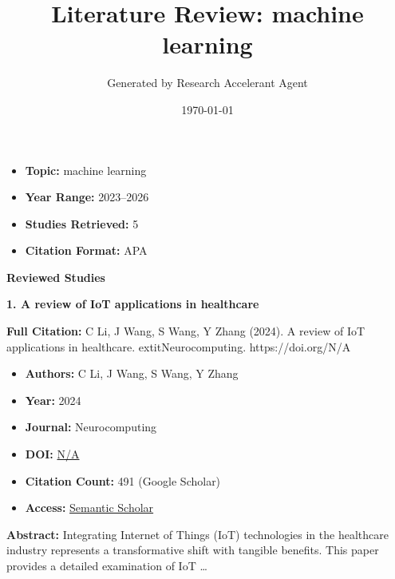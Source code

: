 \documentclass[11pt,a4paper]{article}
\title{\textbf{Literature Review: machine learning }}
\author{Generated by Research Accelerant Agent}
\date{\today}
\begin{document}
\maketitle



\begin{resultbox}
\begin{itemize}[leftmargin=*]
    \item \textbf{Topic:} machine learning 
    \item \textbf{Year Range:} 2023--2026
    \item \textbf{Studies Retrieved:} 5
    \item \textbf{Citation Format:} APA
\end{itemize}
\end{resultbox}

\vspace{1em}

\textbf{\large Reviewed Studies}\par\vspace{0.5em}


\textbf{1. A review of IoT applications in healthcare}

\textbf{Full Citation:} C Li, J Wang, S Wang, Y Zhang (2024). A review of IoT applications in healthcare. 	extit{Neurocomputing}. https://doi.org/N/A

\begin{resultbox}
\begin{itemize}[leftmargin=*]
    \item \textbf{Authors:} C Li, J Wang, S Wang, Y Zhang
    \item \textbf{Year:} 2024
    \item \textbf{Journal:} Neurocomputing
    
    
    
    \item \textbf{DOI:} \href{https://doi.org/}{N/A}
    \item \textbf{Citation Count:} 491 (Google Scholar)
    \item \textbf{Access:} \href{https://www.sciencedirect.com/science/article/pii/S0925231223011402}{Semantic Scholar}
\end{itemize}
\end{resultbox}

\textbf{Abstract:} Integrating Internet of Things (IoT) technologies in the healthcare industry represents a transformative shift with tangible benefits. This paper provides a detailed examination of IoT …\par\vspace{0.5em}
\end{document}
